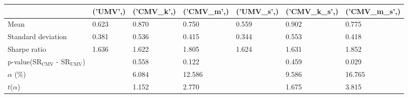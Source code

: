 \begin{tabular}{lllllll}
\toprule
 & ('UMV',) & ('CMV_k',) & ('CMV_m',) & ('UMV_s',) & ('CMV_k_s',) & ('CMV_m_s',) \\
\midrule
Mean & 0.623 & 0.870 & 0.750 & 0.559 & 0.902 & 0.775 \\
Standard deviation & 0.381 & 0.536 & 0.415 & 0.344 & 0.553 & 0.418 \\
Sharpe ratio & 1.636 & 1.622 & 1.805 & 1.624 & 1.631 & 1.852 \\
p-value(SR$_{\text{CMV}}$ - SR$_{\text{UMV}}$) &  & 0.558 & 0.122 &  & 0.459 & 0.029 \\
$\alpha$ (\%) &  & 6.084 & 12.586 &  & 9.586 & 16.765 \\
$t$($\alpha$) &  & 1.152 & 2.770 &  & 1.675 & 3.815 \\
\bottomrule
\end{tabular}
